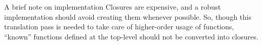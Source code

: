 \documentclass{amsart}
\begin{document}
\begin{section}{A brief note on implementation}
Closures are expensive, and a robust implementation should avoid creating them whenever possible. So, though this translation pass is needed to take care of higher-order usage of functions, ``known'' functions defined at the top-level should not be converted into closures.
\end{section}
\end{document}
